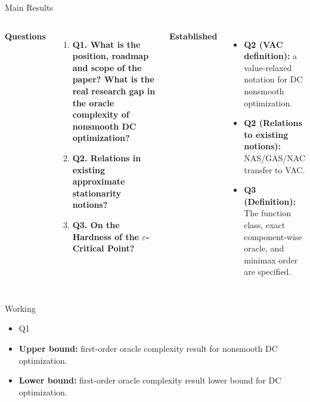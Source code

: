 \documentclass[10pt]{beamer}
\begin{document}
\begin{frame}{Main Results}
\scriptsize
\begin{columns}[T,onlytextwidth]
\textbf{Questions}
\begin{enumerate}\setlength{\itemsep}{3pt}
     \item \textbf{Q1. What is the position, roadmap and scope of the paper? What is the real research gap in the oracle complexity of nonsmooth DC optimization?}
     

    \item \textbf{Q2. Relations in existing approximate stationarity notions?}
    \item \textbf{Q3. On the Hardness of the $\varepsilon$-Critical Point?} 

\end{enumerate}

\textbf{Established}
\begin{itemize}\setlength{\itemsep}{3pt}
    \item \textbf{Q2 (VAC definition):} a value-relaxed notation for DC nonsmooth optimization.
    \item \textbf{Q2 (Relations to existing notions):} NAS/GAS/NAC transfer to VAC. 
    \item \textbf{Q3 (Definition):} The function class, exact component-wise oracle, and
minimax order are specified.
\end{itemize}
\end{columns}

\vspace{0.05cm}
\begin{alertblock}{Working}
\begin{itemize}\setlength{\itemsep}{2pt}
    \item Q1
    \item \textbf{Upper bound:} first-order oracle complexity result for nonsmooth DC optimization.
    \item \textbf{Lower bound:} first-order oracle complexity result lower bound for DC optimization.
\end{itemize}
\end{alertblock}
\end{frame}
\end{document}
